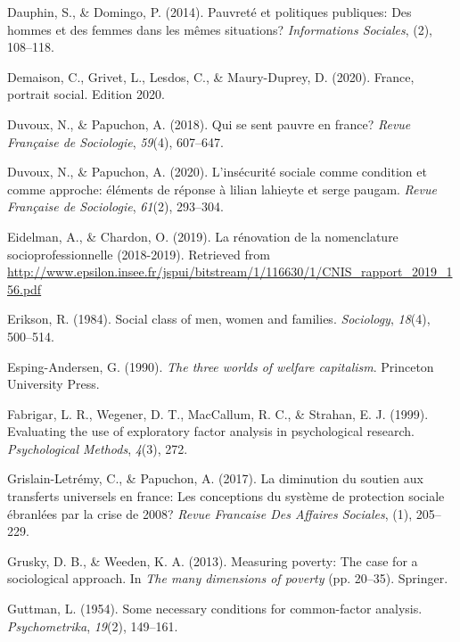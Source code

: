 \documentclass[12pt,a4paper]{reedthesis}
\newenvironment{CSLReferences}%
  {}%
  {\par}
\begin{document}
\begin{CSLReferences}{1}{0}
\leavevmode\hypertarget{ref-dauphin2014pauvrete}{}%
Dauphin, S., \& Domingo, P. (2014). Pauvret{é} et politiques publiques: Des hommes et des femmes dans les m{ê}mes situations? \emph{Informations Sociales}, (2), 108--118.

\leavevmode\hypertarget{ref-demaison2020france}{}%
Demaison, C., Grivet, L., Lesdos, C., \& Maury-Duprey, D. (2020). France, portrait social. Edition 2020.

\leavevmode\hypertarget{ref-duvoux2018qui}{}%
Duvoux, N., \& Papuchon, A. (2018). Qui se sent pauvre en france? \emph{Revue Fran{ç}aise de Sociologie}, \emph{59}(4), 607--647.

\leavevmode\hypertarget{ref-duvoux2020insecurite}{}%
Duvoux, N., \& Papuchon, A. (2020). L'ins{é}curit{é} sociale comme condition et comme approche: {é}l{é}ments de r{é}ponse {à} lilian lahieyte et serge paugam. \emph{Revue Fran{ç}aise de Sociologie}, \emph{61}(2), 293--304.

\leavevmode\hypertarget{ref-eidelman2019renovation}{}%
Eidelman, A., \& Chardon, O. (2019). La r{é}novation de la nomenclature socioprofessionnelle (2018-2019). Retrieved from \url{http://www.epsilon.insee.fr/jspui/bitstream/1/116630/1/CNIS_rapport_2019_156.pdf}

\leavevmode\hypertarget{ref-erikson1984social}{}%
Erikson, R. (1984). Social class of men, women and families. \emph{Sociology}, \emph{18}(4), 500--514.

\leavevmode\hypertarget{ref-esping1990three}{}%
Esping-Andersen, G. (1990). \emph{The three worlds of welfare capitalism}. Princeton University Press.

\leavevmode\hypertarget{ref-fabrigar1999evaluating}{}%
Fabrigar, L. R., Wegener, D. T., MacCallum, R. C., \& Strahan, E. J. (1999). Evaluating the use of exploratory factor analysis in psychological research. \emph{Psychological Methods}, \emph{4}(3), 272.

\leavevmode\hypertarget{ref-grislain2017diminution}{}%
Grislain-Letrémy, C., \& Papuchon, A. (2017). La diminution du soutien aux transferts universels en france: Les conceptions du syst{è}me de protection sociale {é}branl{é}es par la crise de 2008? \emph{Revue Francaise Des Affaires Sociales}, (1), 205--229.

\leavevmode\hypertarget{ref-grusky2013measuring}{}%
Grusky, D. B., \& Weeden, K. A. (2013). Measuring poverty: The case for a sociological approach. In \emph{The many dimensions of poverty} (pp. 20--35). Springer.

\leavevmode\hypertarget{ref-guttman1954some}{}%
Guttman, L. (1954). Some necessary conditions for common-factor analysis. \emph{Psychometrika}, \emph{19}(2), 149--161.


\end{CSLReferences}
\end{document}
